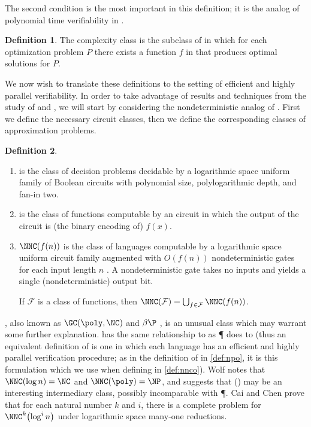 \documentclass[]{article}
\theoremstyle{plain}
\theoremstyle{definition}
\newtheorem{definition}{Definition}
\let\originalleft\left
\let\originalright\right
\renewcommand{\left}{\mathopen{}\mathclose\bgroup\originalleft}
\renewcommand{\right}{\aftergroup\egroup\originalright}
\begin{document}
The second condition is the most important in this definition; it is the analog of polynomial time verifiability in \NP.

\begin{definition}
  The complexity class \PO{} is the subclass of \NPO{} in which for each optimization problem $P$ there exists a function $f$ in \FP{} that produces optimal solutions for $P$.
\end{definition}

We now wish to translate these definitions to the setting of efficient and highly parallel verifiability.
In order to take advantage of results and techniques from the study of \NPO{} and \PO, we will start by considering the nondeterministic analog of \PO.
First we define the necessary circuit classes, then we define the corresponding classes of approximation problems.

\begin{definition}
  \mbox{}
  \begin{enumerate}
  \item \NC{} is the class of decision problems decidable by a logarithmic space uniform family of Boolean circuits with polynomial size, polylogarithmic depth, and fan-in two.
  \item \FNC{} is the class of functions computable by an \NC{} circuit in which the output of the circuit is (the binary encoding of) $f(x)$.
  \item $\NNC(f(n))$ is the class of languages computable by a logarithmic space uniform \NC{} circuit family augmented with $O(f(n))$ nondeterministic gates for each input length $n$ \cite{wolf94}.
    A nondeterministic gate takes no inputs and yields a single (nondeterministic) output bit.

    If $\mathcal{F}$ is a class of functions, then $\NNC(\mathcal{F})=\bigcup_{f\in\mathcal{F}}{\NNC(f(n))}$.
  \end{enumerate}
\end{definition}

\NNCpoly, also known as $\GC(\poly, \NC)$ \cite{cc97} and $\beta\P$ \cite{kf80}, is an unusual class which may warrant some further explanation.
\NC{} has the same relationship to \NNCpoly{} as \P{} does to \NP{} (thus an equivalent definition of \NNCpoly{} is one in which each language has an efficient and highly parallel verification procedure; as in the definition of \NPO{} in \autoref{def:npo}, it is this formulation which we use when defining \NNCO{} in \autoref{def:nnco}).
Wolf \cite{wolf94} notes that $\NNC(\log n)=\NC$ and $\NNC(\poly)=\NP$, and suggests that \NNC(\polylog) may be an interesting intermediary class, possibly incomparable with \P.
Cai and Chen \cite{cc97} prove that for each natural number $k$ and $i$, there is a complete problem for $\NNC^k\left(\log^i n\right)$ under logarithmic space many-one reductions.
\end{document}

